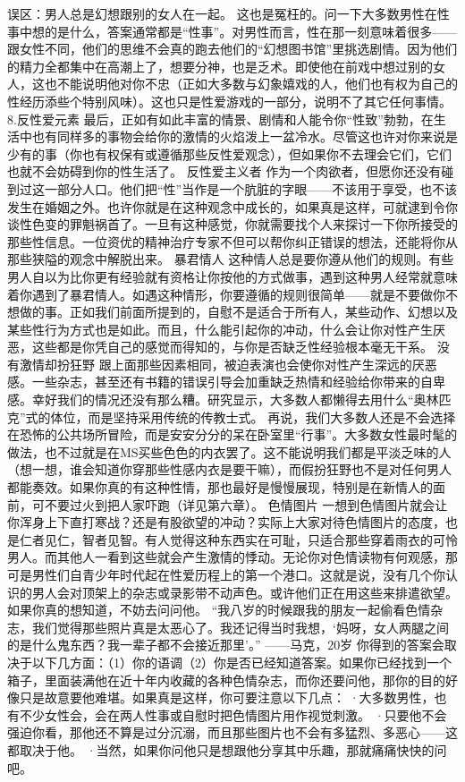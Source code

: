 \documentclass[12pt,UTF8]{ctexbook}
\begin{document}
误区：男人总是幻想跟别的女人在一起。
这也是冤枉的。问一下大多数男性在性事中想的是什么，答案通常都是“性事”。对男性而言，性在那一刻意味着很多——跟女性不同，他们的思维不会真的跑去他们的“幻想图书馆”里挑选剧情。因为他们的精力全都集中在高潮上了，想要分神，也是乏术。即使他在前戏中想过别的女人，这也不能说明他对你不忠（正如大多数与幻象嬉戏的人，他们也有权为自己的性经历添些个特别风味）。这也只是性爱游戏的一部分，说明不了其它任何事情。
8.反性爱元素
最后，正如有如此丰富的情景、剧情和人能令你“性致”勃勃，在生活中也有同样多的事物会给你的激情的火焰泼上一盆冷水。尽管这也许对你来说是少有的事（你也有权保有或遵循那些反性爱观念），但如果你不去理会它们，它们也就不会妨碍到你的性生活了。
反性爱主义者
作为一个肉欲者，但愿你还没有碰到过这一部分人口。他们把“性”当作是一个肮脏的字眼——不该用于享受，也不该发生在婚姻之外。也许你就是在这种观念中成长的，如果真是这样，可就逮到令你谈性色变的罪魁祸首了。一旦有这种感觉，你就需要找个人来探讨一下你所接受的那些性信息。一位资优的精神治疗专家不但可以帮你纠正错误的想法，还能将你从那些狭隘的观念中解脱出来。
暴君情人
这种情人总是要你遵从他们的规则。有些男人自以为比你更有经验就有资格让你按他的方式做事，遇到这种男人经常就意味着你遇到了暴君情人。如遇这种情形，你要遵循的规则很简单——就是不要做你不想做的事。正如我们前面所提到的，自慰不是适合于所有人，某些动作、幻想以及某些性行为方式也是如此。而且，什么能引起你的冲动，什么会让你对性产生厌恶，这些都是你凭自己的感觉而得知的，与你是否缺乏性经验根本毫无干系。
没有激情却扮狂野
跟上面那些因素相同，被迫表演也会使你对性产生深远的厌恶感。一些杂志，甚至还有书籍的错误引导会加重缺乏热情和经验给你带来的自卑感。幸好我们的情况还没有那么糟。研究显示，大多数人都懒得去用什么“奥林匹克”式的体位，而是坚持采用传统的传教士式。
再说，我们大多数人还是不会选择在恐怖的公共场所冒险，而是安安分分的呆在卧室里“行事”。大多数女性最时髦的做法，也不过就是在MS买些色色的内衣罢了。这不能说明我们都是平淡乏味的人（想一想，谁会知道你穿那些性感内衣是要干嘛），而假扮狂野也不是对任何男人都能奏效。如果你真的有这种性情，那也最好是慢慢展现，特别是在新情人的面前，可不要过火到把人家吓跑（详见第六章）。
色情图片
一想到色情图片就会让你浑身上下直打寒战？还是有股欲望的冲动？实际上大家对待色情图片的态度，也是仁者见仁，智者见智。有人觉得这种东西实在可耻，只适合那些穿着雨衣的可怜男人。而其他人一看到这些就会产生激情的悸动。无论你对色情读物有何观感，那可是男性们自青少年时代起在性爱历程上的第一个港口。这就是说，没有几个你认识的男人会对顶架上的杂志或录影带不动声色。或许他们正在用这些来排遣欲望。如果你真的想知道，不妨去问问他。
“我八岁的时候跟我的朋友一起偷看色情杂志，我们觉得那些照片真是太恶心了。我还记得当时我想，‘妈呀，女人两腿之间的是什么鬼东西？我一辈子都不会接近那里’。”
——马克，20岁
你得到的答案会取决于以下几方面：（1）你的语调（2）你是否已经知道答案。如果你已经找到一个箱子，里面装满他在近十年内收藏的各种色情杂志，而你还要问他，那你的目的好像只是故意要他难堪。如果真是这样，你可要注意以下几点：
·大多数男性，也有不少女性会，会在两人性事或自慰时把色情图片用作视觉刺激。
·只要他不会强迫你看，那他还不算是过分沉溺，而且那些图片也不会有多猛烈、多恶心——这都取决于他。
·当然，如果你问他只是想跟他分享其中乐趣，那就痛痛快快的问吧。
\end{document}
